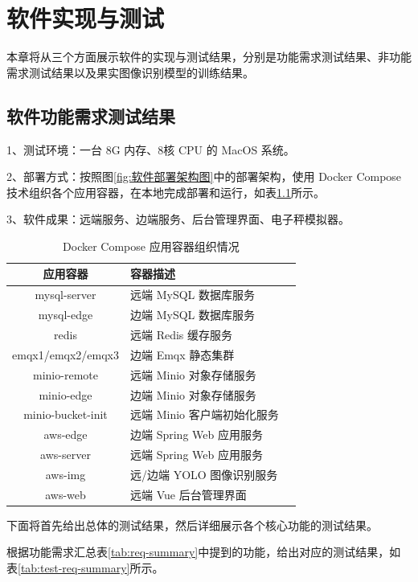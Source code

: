 \chapter{软件实现与测试}

本章将从三个方面展示软件的实现与测试结果，分别是功能需求测试结果、非功能需求测试结果以及果实图像识别模型的训练结果。

\section{软件功能需求测试结果}\label{sec:test-func}

1、测试环境：一台 8G 内存、8核 CPU 的 MacOS 系统。

2、部署方式：按照图\ref{fig:软件部署架构图}中的部署架构，使用 Docker Compose 技术组织各个应用容器，在本地完成部署和运行，如表\ref{tab:docker-compose}所示。

3、软件成果：远端服务、边端服务、后台管理界面、电子秤模拟器。

\begin{longtable}[ht]{|c|p{8cm}|c|}
\caption{Docker Compose 应用容器组织情况}
\label{tab:docker-compose}
\\
\hline
应用容器 & 容器描述 \\\hline
mysql-server & 远端 MySQL 数据库服务  \\\hline
mysql-edge & 边端 MySQL 数据库服务  \\\hline
redis & 远端 Redis 缓存服务  \\\hline
emqx1/emqx2/emqx3 & 边端 Emqx 静态集群  \\\hline
minio-remote & 远端 Minio 对象存储服务  \\\hline
minio-edge & 边端 Minio 对象存储服务  \\\hline
minio-bucket-init & 远端 Minio 客户端初始化服务  \\\hline
aws-edge & 边端 Spring Web 应用服务  \\\hline
aws-server & 远端 Spring Web 应用服务  \\\hline
aws-img & 远/边端 YOLO 图像识别服务  \\\hline
aws-web & 远端 Vue 后台管理界面  \\\hline
\end{longtable}

下面将首先给出总体的测试结果，然后详细展示各个核心功能的测试结果。

根据功能需求汇总表\ref{tab:req-summary}中提到的功能，给出对应的测试结果，如表\ref{tab:test-req-summary}所示。

